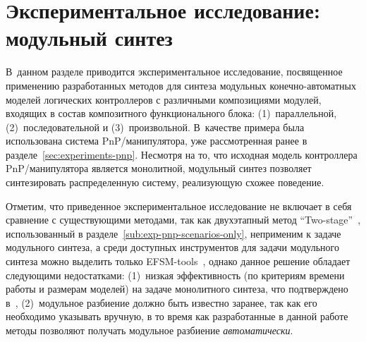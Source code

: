 \section{Экспериментальное исследование: модульный синтез}%
\label{sec:experiments-modular-synthesis}


В~данном разделе приводится экспериментальное исследование, посвященное применению разработанных методов для синтеза модульных конечно-автоматных моделей логических контроллеров с различными композициями модулей, входящих в состав композитного функционального блока: (1)~параллельной, (2)~последовательной и (3)~произвольной.
В~качестве примера была использована система PnP\-/манипулятора, уже рассмотренная ранее в разделе~\ref{sec:experiments-pnp}.
Несмотря на то, что исходная модель контроллера PnP\-/манипулятора является монолитной, модульный синтез позволяет синтезировать распределенную систему, реализующую схожее поведение.

Отметим, что приведенное экспериментальное исследование не включает в себя сравнение с существующими методами, так как двухэтапный метод \enquote{Two-stage}~\cite{chivilikhin-19}, использованный в разделе~\ref{sub:exp-pnp-scenarios-only}, неприменим к задаче модульного синтеза, а среди доступных инструментов для задачи модульного синтеза можно выделить только EFSM-tools~\cite{efsm-tools}, однако данное решение обладает следующими недостатками: (1)~низкая эффективность (по критериям времени работы и размерам моделей) на задаче монолитного синтеза, что подтверждено в~\cite{chivilikhin-19}, (2)~модульное разбиение должно быть известно заранее, так как его необходимо указывать вручную, в то время как разработанные в данной работе методы позволяют получать модульное разбиение \textit{автоматически}.

